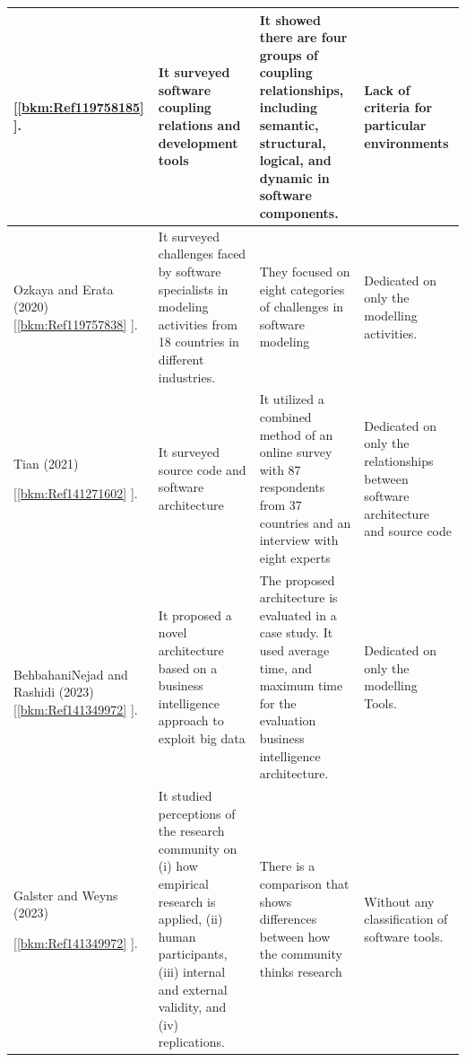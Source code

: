 \documentclass[asymmetric, a4paper]{article}
\begin{document}
\begin{scriptsize}
\begin{center}
\begin{supertabular}{|m{1.0004599in}|m{1.7913599in}|m{2.0865598in}|m{1.3781599in}|}
			\centering \textcolor[HTML]{2E2E2E}{[\ref{bkm:Ref119758185} ].} &
			\textcolor[HTML]{2E2E2E}{It surveyed software coupling relations and development tools} &
			\vskip 2mm \textcolor[HTML]{2E2E2E}{It showed there are four groups of coupling relationships, including semantic, structural,
				logical, and dynamic in software components.} &
			\textcolor[HTML]{2E2E2E}{Lack of criteria for particular environments}\\\hline
			\centering \textcolor[HTML]{2E2E2E}{Ozkaya and Erata (2020) [\ref{bkm:Ref119757838} ].} &
			\vskip 2mm \textcolor[HTML]{2E2E2E}{It surveyed challenges faced by software specialists in modeling activities from 18 countries
				in different industries.} &
			\textcolor[HTML]{2E2E2E}{They focused on eight categories of challenges in software modeling} &
			\textcolor[HTML]{2E2E2E}{Dedicated on only the modelling activities.}\\\hline
			{\centering \textcolor[HTML]{2E2E2E}{Tian (2021)}\par}
			
			\centering \textcolor[HTML]{2E2E2E}{[\ref{bkm:Ref141271602} ].} &
			\textcolor[HTML]{2E2E2E}{It surveyed source code and software architecture} &
			\vskip 2mm \textcolor[HTML]{2E2E2E}{It utilized a combined method of an online survey with 87 respondents from 37 countries and an
				interview with eight experts} &
			\textcolor[HTML]{2E2E2E}{Dedicated on only the relationships between software architecture and source code}\\\hline
			~
			
			\centering \textcolor[HTML]{2E2E2E}{BehbahaniNejad and Rashidi (2023) [\ref{bkm:Ref141349972} ].} &
			\textcolor[HTML]{2E2E2E}{It proposed a novel architecture based on a business intelligence approach to exploit big data}
			&
			\vskip 2mm \textcolor[HTML]{2E2E2E}{The proposed architecture is evaluated in a case study. It used average time, and maximum time
				for the evaluation business intelligence architecture.} &
			\textcolor[HTML]{2E2E2E}{Dedicated on only the modelling Tools.}\\\hline
			{\centering \textcolor[HTML]{2E2E2E}{Galster and Weyns (2023)}\par}
			
			\centering \textcolor[HTML]{2E2E2E}{[\ref{bkm:Ref141349972} ].} &
			\vskip 2mm \textcolor[HTML]{2E2E2E}{It studied perceptions of the research community on (i) how empirical research is applied, (ii)
				human participants, (iii) internal and external validity, and (iv) replications.} &
			\textcolor[HTML]{2E2E2E}{There is a comparison that shows differences between how the community thinks research} &
			\textcolor[HTML]{2E2E2E}{Without any classification of software tools.}\\\hline
		\end{supertabular}
	\end{center}
\end{scriptsize}
\end{document}
